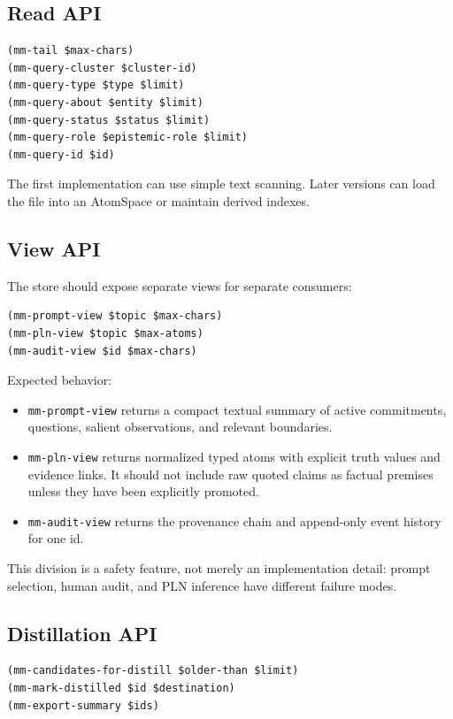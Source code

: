 \documentclass[11pt]{article}
\begin{document}
\subsection{Read API}

\begin{verbatim}
(mm-tail $max-chars)
(mm-query-cluster $cluster-id)
(mm-query-type $type $limit)
(mm-query-about $entity $limit)
(mm-query-status $status $limit)
(mm-query-role $epistemic-role $limit)
(mm-query-id $id)
\end{verbatim}

The first implementation can use simple text scanning.  Later versions can load the
file into an AtomSpace or maintain derived indexes.

\subsection{View API}

The store should expose separate views for separate consumers:

\begin{verbatim}
(mm-prompt-view $topic $max-chars)
(mm-pln-view $topic $max-atoms)
(mm-audit-view $id $max-chars)
\end{verbatim}

Expected behavior:
\begin{itemize}
  \item \texttt{mm-prompt-view} returns a compact textual summary of active
        commitments, questions, salient observations, and relevant boundaries.
  \item \texttt{mm-pln-view} returns normalized typed atoms with explicit truth values
        and evidence links.  It should not include raw quoted claims as factual
        premises unless they have been explicitly promoted.
  \item \texttt{mm-audit-view} returns the provenance chain and append-only event
        history for one id.
\end{itemize}

This division is a safety feature, not merely an implementation detail: prompt
selection, human audit, and PLN inference have different failure modes.

\subsection{Distillation API}

\begin{verbatim}
(mm-candidates-for-distill $older-than $limit)
(mm-mark-distilled $id $destination)
(mm-export-summary $ids)
\end{verbatim}
\end{document}
